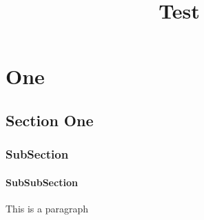 \documentclass[14pt,a5paper]{book}
\begin{document}
	
	\title{Test}
	\maketitle
	
	\tableofcontents
	
	\setcounter{secnumdepth}{3}
	
	
	\chapter{One}
	\section{Section One}
	\subsection{SubSection}
	\subsubsection{SubSubSection}
	
	This is a paragraph
	
\end{document}
